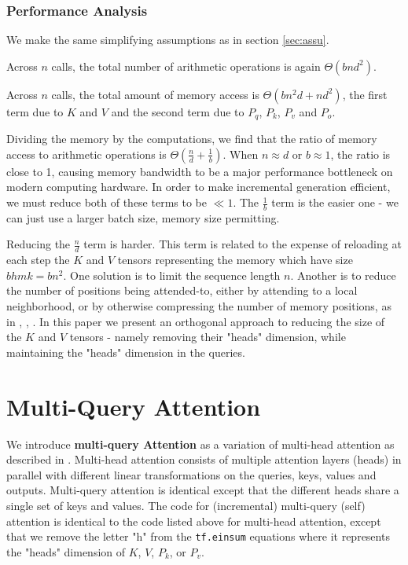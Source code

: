 \subsubsection{Performance Analysis}

We make the same simplifying assumptions as in section \ref{sec:assu}.

Across $n$ calls, the total number of arithmetic operations is again $\Theta(bnd^2)$.

Across $n$ calls, the total amount of memory access is $\Theta(bn^2d + nd^2)$, the first term due to $K$ and $V$ and the second term due to  $P_q$, $P_k$, $P_v$ and $P_o$.

Dividing the memory by the computations, we find that the ratio of memory access to arithmetic operations is $\Theta(\frac{n}{d} + \frac{1}{b})$.  When $n \approx d$ or $b \approx 1$, the ratio is close to 1, causing memory bandwidth to be a major performance bottleneck on modern computing hardware.  In order to make incremental generation efficient, we must reduce both of these terms to be $\ll1$.  The $\frac{1}{b}$ term is the easier one - we can just use a larger batch size, memory size permitting.

Reducing the $\frac{n}{d}$ term is harder.  This term is related to the expense of reloading at each step the $K$ and $V$ tensors representing the memory which have size $bhmk=bn^2$. One solution is to limit the sequence length $n$.  Another is to reduce the number of positions being attended-to, either by attending to a local neighborhood, or by otherwise compressing the number of memory positions,  as in \citep{liu2018generatin}, \citep{1805.00631}, \citep{povey2018time}.  In this paper we present an orthogonal approach to reducing the size of the $K$ and $V$ tensors - namely removing their "heads" dimension, while maintaining the "heads" dimension in the queries.

\section{Multi-Query Attention}

We introduce \textbf{multi-query Attention} as a variation of multi-head attention as described in \citep{Vas17}.  Multi-head attention consists of multiple attention layers (heads) in parallel with different linear transformations on the queries, keys, values and outputs.  Multi-query attention is identical except that the different heads share a single set of keys and values.  The code for (incremental) multi-query (self) attention is identical to the code listed above for multi-head attention, except that we remove the letter "h" from the \texttt{tf.einsum} equations where it represents the "heads" dimension of $K$, $V$, $P_k$, or $P_v$.

